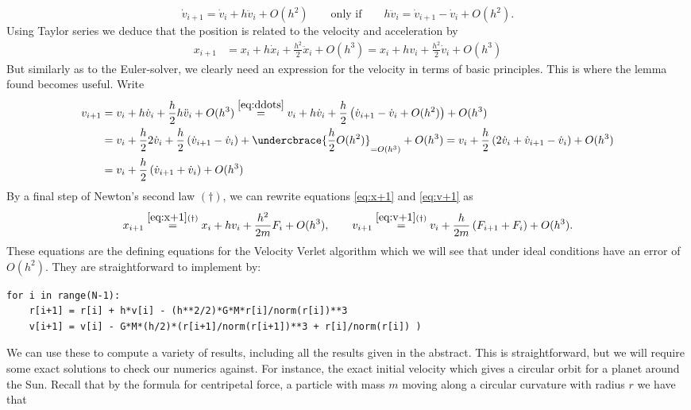 \documentclass[11pt,english,a4paper]{article}
\begin{document}
\begin{equation}
\dot{v}_{i+1} = \dot{v}_i + h \ddot{v}_i + O(h^2) \qquad \text{only if}  \qquad h \ddot{v}_i = \dot{v}_{i+1} - \dot{v}_i + O(h^2). \label{eq:ddots}
\end{equation}
Using Taylor series we deduce that the position is related to the velocity and acceleration by
\begin{align}
x_{  i+1} &= x_i + h \dot{x}_i + \frac{h^2}{2} \ddot{x}_i + O(h^3) = x_i + h v_i + \frac{h^2}{2} \dot{v}_i + O(h^3)
\label{eq:x+1}
\end{align}
But similarly as to the Euler-solver, we clearly need an expression for the velocity in terms of basic principles. This is where the lemma found becomes useful. Write
\begin{align}
v_{  i+1} &= v_i + h \dot{v}_i + \frac{h}{2}h \ddot{v}_i + O(h^3) \stackrel{\eqref{eq:ddots}}{=} v_i + h \dot{v}_i + \frac{h}{2}\left(\dot{v}_{i+1} - \dot{v}_i + O(h^2) \right) + O(h^3) \nonumber \\
& = v_i + \frac{h}{2} 2\dot{v}_i + \frac{h}{2}\left(\dot{v}_{i+1} - \dot{v}_i\right) + \undercbrace{\frac{h}{2}O(h^2)}_{= O(h^3)}  + O(h^3) = v_i + \frac{h}{2}\left(2 \dot{v}_i + \dot{v}_{i+1} - \dot{v}_i\right) + O(h^3) \nonumber \\
&= v_i + \frac{h}{2}\left(\dot{v}_{i+1} + \dot{v}_i \right) + O(h^3) \label{eq:v+1}
\end{align}
By a final step of Newton's second law $(\dagger)$, we can rewrite equations \eqref{eq:x+1} and \eqref{eq:v+1} as
\begin{equation}
x_{  i+1} \stackrel{\eqref{eq:x+1}(\dagger)}{=} x_i + h v_i + \frac{h^2}{2m} F_i + O(h^3), \qquad v_{  i+1} \stackrel{\eqref{eq:v+1}(\dagger)}{=} v_i + \frac{h}{2m}\left(F_{i+1} + F_i \right) + O(h^3). \label{eq:defverlet}
\end{equation}
These equations are the defining equations for the Velocity Verlet algorithm which we will see that under ideal conditions have an error of $O(h^2)$. They are straightforward to implement by:
\begin{center}
\begin{lstlisting}
for i in range(N-1):
    r[i+1] = r[i] + h*v[i] - (h**2/2)*G*M*r[i]/norm(r[i])**3
    v[i+1] = v[i] - G*M*(h/2)*(r[i+1]/norm(r[i+1])**3 + r[i]/norm(r[i]) )
\end{lstlisting}
\end{center}
We can use these to compute a variety of results, including all the results given in the abstract. This is straightforward, but we will require some exact solutions to check our numerics against. For instance, the exact initial velocity which gives a circular orbit for a planet around the Sun. Recall that by the formula for centripetal force, a particle with mass $m$ moving along a circular curvature with radius $r$ we have that
\end{document}
